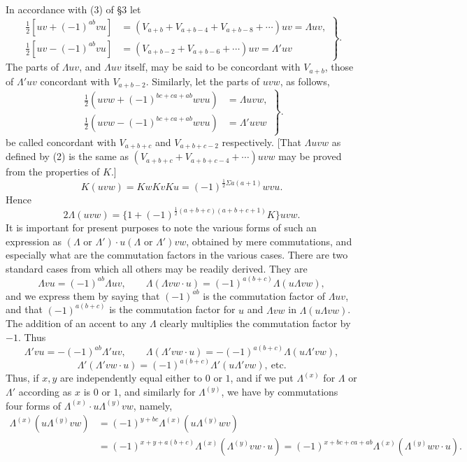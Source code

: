 \documentclass[11pt]{article}
\begin{document}
In accordance with (3) of §3 let
\begin{equation}\left.\begin{aligned}\tfrac12[uv+(-1)^{ab}vu]&=(V_{a+b}+V_{a+b-4}+V_{a+b-8}+\cdots)uv=\Lambda uv,\\\tfrac12[uv-(-1)^{ab}vu]&=(V_{a+b-2}+V_{a+b-6}+\cdots)uv=\Lambda'uv\end{aligned}\right\}.\tag{1}\end{equation}
The parts of $\Lambda uv$, and $\Lambda uv$ itself, may be said to be concordant with $V_{a+b}$, those of $\Lambda'uv$ concordant with $V_{a+b-2}$. Similarly, let the parts of $uvw$, as follows,
\begin{equation}\left.\begin{aligned}\tfrac12(uvw+(-1)^{bc+ca+ab}wvu)&=\Lambda uvw,\\\tfrac12(uvw-(-1)^{bc+ca+ab}wvu)&=\Lambda'uvw\end{aligned}\right\}.\tag{2}\end{equation}
be called concordant with $V_{a+b+c}$ and $V_{a+b+c-2}$ respectively. [That $\Lambda uvw$ as defined by (2) is the same as $(V_{a+b+c}+V_{a+b+c-4}+\cdots)uvw$ may be proved from the properties of $K$.]
\[K(uvw)=KwKvKu=(-1)^{\frac12\Sigma a(a+1)}wvu.\]
Hence
\[2\Lambda(uvw)=\{1+(-1)^{\frac12(a+b+c)(a+b+c+1)}K\}uvw.\]
It is important for present purposes to note the various forms of such an expression as $(\Lambda\text{ or }\Lambda')\cdot u(\Lambda\text{ or }\Lambda')vw$, obtained by mere commutations, and especially what are the commutation factors in the various cases. There are two standard cases from which all others may be readily derived. They are
\[\Lambda vu=(-1)^{ab}\Lambda uv,\qquad\Lambda(\Lambda vw\cdot u)=(-1)^{a(b+c)}\Lambda(u\Lambda vw),\]
and we express them by saying that $(-1)^{ab}$ is the commutation factor of $\Lambda uv$, and that $(-1)^{a(b+c)}$ is the commutation factor for $u$ and $\Lambda vw$ in $\Lambda(u\Lambda vw)$. The addition of an accent to any $\Lambda$ clearly multiplies the commutation factor by $-1$. Thus
\[\Lambda'vu=-(-1)^{ab}\Lambda'uv,\qquad\Lambda(\Lambda'vw\cdot u)=-(-1)^{a(b+c)}\Lambda(u\Lambda'vw),\]
\[\Lambda'(\Lambda'vw\cdot u)=(-1)^{a(b+c)}\Lambda'(u\Lambda'vw),\ \text{etc.}\]
Thus, if $x,y$ are independently equal either to $0$ or $1$, and if we put $\Lambda^{(x)}$ for $\Lambda$ or $\Lambda'$ according as $x$ is $0$ or $1$, and similarly for $\Lambda^{(y)}$, we have by commutations four forms of $\Lambda^{(x)}\cdot u\Lambda^{(y)}vw$, namely,
\begin{equation}
\begin{aligned}
\Lambda^{(x)}(u\Lambda^{(y)}vw)&=(-1)^{y+bc}\Lambda^{(x)}(u\Lambda^{(y)}wv)\\
&=(-1)^{x+y+a(b+c)}\Lambda^{(x)}(\Lambda^{(y)}vw\cdot u)
=(-1)^{x+bc+ca+ab}\Lambda^{(x)}(\Lambda^{(y)}wv\cdot u).
\end{aligned}
\tag{3}
\end{equation}
\end{document}
